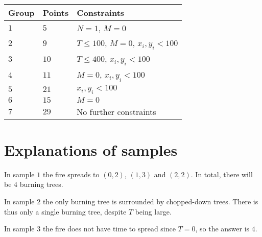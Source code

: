 \noindent
\begin{tabular}{| l | l | l |}
\hline
Group & Points & Constraints \\ \hline
$1$   & $5$        & $N = 1$, $M = 0$ \\ \hline
$2$   & $9$        & $T \leq 100$, $M = 0$, $x_i, y_i < 100$\\ \hline
$3$   & $10$       & $T \leq 400$, $x_i, y_i < 100$ \\ \hline
$4$   & $11$       & $M = 0$, $x_i, y_i < 100$ \\ \hline
$5$   & $21$       & $x_i, y_i < 100$ \\ \hline
$6$   & $15$       & $M = 0$ \\ \hline
$7$   & $29$       & No further constraints \\ \hline
\end{tabular}

\section*{Explanations of samples}
In sample $1$ the fire spreads to $(0,2)$, $(1,3)$ and $(2,2)$.
In total, there will be $4$ burning trees.

In sample $2$ the only burning tree is surrounded by chopped-down trees.
There is thus only a single burning tree, despite $T$ being large.

In sample $3$ the fire does not have time to spread since $T = 0$, so the answer is $4$.
